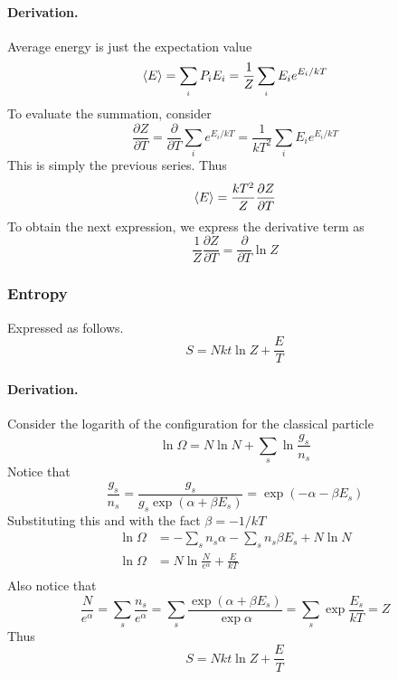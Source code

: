 \documentclass[../../../Main.tex]{subfiles}
\begin{document}
\paragraph*{Derivation.} Average energy is just the expectation value
\begin{equation*}
    \braket{E}=\sum_{_i}P_iE_i=\frac{1}{Z}\sum_{_i}E_ie^{E_i/kT}
\end{equation*}
To evaluate the summation, consider
\begin{equation*}
    \frac{\partial Z}{\partial T}=\frac{\partial}{\partial T}\sum_i e^{E_i/kT}=\frac{1}{kT^2}\sum_i E_ie^{E_i/kT}
\end{equation*}
This is simply the previous series. Thus
\begin{equation*}
    \braket{E}=\frac{kT^2}{Z}\frac{\partial Z}{\partial T}
\end{equation*}
To obtain the next expression, we express the derivative term as
\begin{equation*}
    \frac{1}{Z}\frac{\partial Z}{\partial T}=\frac{\partial }{\partial T}\ln Z
\end{equation*}

\subsubsection*{Entropy}
Expressed as follows.
\begin{equation*}
    S=Nkt\ln Z+\frac{E}{T}
\end{equation*}
\paragraph*{Derivation.} Consider the logarith of the configuration for the classical particle 
\begin{equation*}
    \ln \Omega=N\ln N +\sum_s\ln\frac{g_s}{n_s}
\end{equation*} 
Notice that
\begin{equation*}
    \frac{g_s}{n_s}=\frac{g_s}{g_s\exp(\alpha+\beta E_s)}=\exp(-\alpha-\beta E_s)
\end{equation*}
Substituting this and with the fact $\beta=-1/kT$
\begin{align*}
    \ln \Omega&=-\sum_sn_s\alpha-\sum_sn_s\beta E_s+N\ln N\\
    \ln\Omega&= N\ln \frac{N}{e^\alpha}+\frac{E}{kT}\\
\end{align*}
Also notice that 
\begin{equation*}
    \frac{N}{e^\alpha}=\sum_s\frac{n_s}{e^\alpha}=\sum_s\frac{\exp(\alpha+\beta E_s)}{\exp\alpha}=\sum_s\exp \frac{E_s}{kT}=Z
\end{equation*}
Thus
\begin{equation*}
    S=Nkt\ln Z+\frac{E}{T}
\end{equation*}
\end{document}
